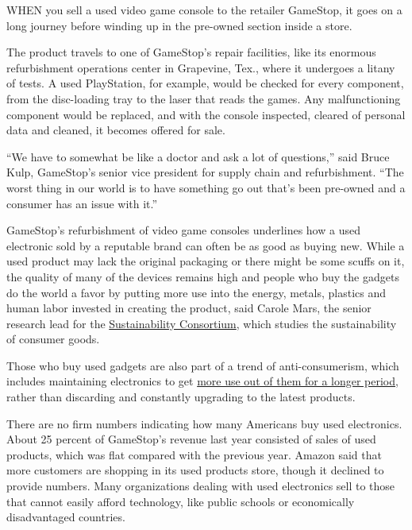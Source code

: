 WHEN you sell a used video game console to the retailer GameStop, it
goes on a long journey before winding up in the pre-owned section inside
a store.

The product travels to one of GameStop's repair facilities, like its
enormous refurbishment operations center in Grapevine, Tex., where it
undergoes a litany of tests. A used PlayStation, for example, would be
checked for every component, from the disc-loading tray to the laser
that reads the games. Any malfunctioning component would be replaced,
and with the console inspected, cleared of personal data and cleaned, it
becomes offered for sale.

``We have to somewhat be like a doctor and ask a lot of questions,''
said Bruce Kulp, GameStop's senior vice president for supply chain and
refurbishment. ``The worst thing in our world is to have something go
out that's been pre-owned and a consumer has an issue with it.''

GameStop's refurbishment of video game consoles underlines how a used
electronic sold by a reputable brand can often be as good as buying new.
While a used product may lack the original packaging or there might be
some scuffs on it, the quality of many of the devices remains high and
people who buy the gadgets do the world a favor by putting more use into
the energy, metals, plastics and human labor invested in creating the
product, said Carole Mars, the senior research lead for the
\href{https://www.sustainabilityconsortium.org/}{Sustainability
Consortium}, which studies the sustainability of consumer goods.

Those who buy used gadgets are also part of a trend of anti-consumerism,
which includes maintaining electronics to get
\href{http://www.nytimes3xbfgragh.onion/2016/04/21/technology/personaltech/choosing-to-skipthe-upgrade-and-care-for-the-gadget-youve-got.html}{more
use out of them for a longer period}, rather than discarding and
constantly upgrading to the latest products.

There are no firm numbers indicating how many Americans buy used
electronics. About 25 percent of GameStop's revenue last year consisted
of sales of used products, which was flat compared with the previous
year. Amazon said that more customers are shopping in its used products
store, though it declined to provide numbers. Many organizations dealing
with used electronics sell to those that cannot easily afford
technology, like public schools or economically disadvantaged countries.

